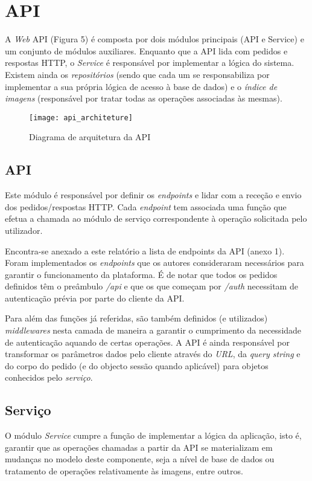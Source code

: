 \section{API}

A \textit{Web} API (Figura 5) é composta por dois módulos principais (API e Service) e um conjunto de módulos auxiliares. Enquanto que a API lida com pedidos e respostas HTTP, o \textit{Service} é responsável por implementar a lógica do sistema. Existem ainda os \textit{repositórios} (sendo que cada um se responsabiliza por implementar a sua própria lógica de acesso à base de dados) e o \textit{índice de imagens} (responsável por tratar todas as operações associadas às mesmas).~\cite{nodejs_the_right_way}\par \medskip

\begin{figure}[h]
	\centering
	\texttt{[image: api\_architeture]}
	\caption{Diagrama de arquitetura da API}
\end{figure}

\subsection{API}
Este módulo é responsável por definir os \textit{endpoints} e lidar com a receção e envio dos pedidos/respostas HTTP. Cada \textit{endpoint} tem associada uma função que efetua a chamada ao módulo de serviço correspondente à operação solicitada pelo utilizador. \par \medskip

Encontra-se anexado a este relatório a lista de endpoints da API (anexo 1). Foram implementados os \textit{endpoints} que os autores consideraram necessários para garantir o funcionamento da plataforma. É de notar que todos os pedidos definidos têm o preâmbulo \textit{/api} e que os que começam por \textit{/auth} necessitam de autenticação prévia por parte do cliente da API. \par \medskip

Para além das funções já referidas, são também definidos (e utilizados) \textit{middlewares} nesta camada de maneira a garantir o cumprimento da necessidade de autenticação aquando de certas operações. A API é ainda responsável por transformar os parâmetros dados pelo cliente através do \textit{URL}, da \textit{query string} e do corpo do pedido (e do objecto sessão quando aplicável) para objetos conhecidos pelo \textit{serviço}. \medskip

\subsection{Serviço}
O módulo \textit{Service} cumpre a função de implementar a lógica da aplicação, isto é, garantir que as operações chamadas a partir da API se materializam em mudanças no modelo deste componente, seja a nível de base de dados ou tratamento de operações relativamente às imagens, entre outros. \par \medskip

